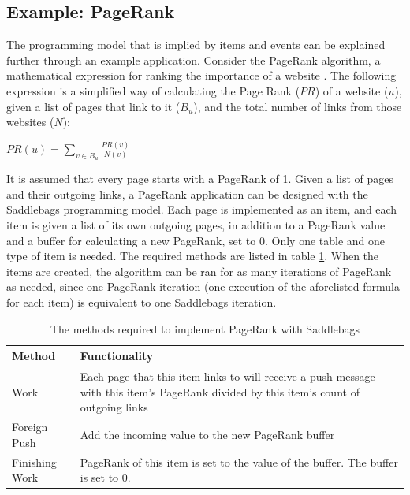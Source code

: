\documentclass{uit-report}
\begin{document}
\subsection{Example: PageRank}
The programming model that is implied by items and events can be explained further through an example application. Consider the PageRank algorithm, a mathematical expression for ranking the importance of a website \cite{pagerank}. The following expression is a simplified way of calculating the Page Rank ($PR$) of a website ($u$), given a list of pages that link to it ($B_u$), and the total number of links from those websites ($N$):

\vspace{10pt}
\begin{center}
${\displaystyle PR(u)=\sum_{v\in B_{u}}{\frac{PR(v)}{N(v)}}}$

\end{center}
\vspace{20pt}

It is assumed that every page starts with a PageRank of 1. Given a list of pages and their outgoing links, a PageRank application can be designed with the Saddlebags programming model. Each page is implemented as an item, and each item is given a list of its own outgoing pages, in addition to a PageRank value and a buffer for calculating a new PageRank, set to 0. Only one table and one type of item is needed. The required methods are listed in table \ref{table:pagerankevents}. When the items are created, the algorithm can be ran for as many iterations of PageRank as needed, since one PageRank iteration (one execution of the aforelisted formula for each item) is equivalent to one Saddlebags iteration.

\begin{table}[h]
	\setlength\arrayrulewidth{1pt}
	\renewcommand{\arraystretch}{2}
	\begin{tabular}{ | p{3cm} | p{12cm} |}
		\hline
		\textbf{Method} & \textbf{Functionality} \\ \hline
		Work & Each page that this item links to will receive a push message with this item's PageRank divided by this item's count of outgoing links \\ \hline
		Foreign Push & Add the incoming value to the new PageRank buffer \\ \hline
		Finishing Work & PageRank of this item is set to the value of the buffer. The buffer is set to 0.\\ \hline
		
	\end{tabular}
	\caption{The methods required to implement PageRank with Saddlebags}
	\label{table:pagerankevents}
\end{table}
\end{document}
